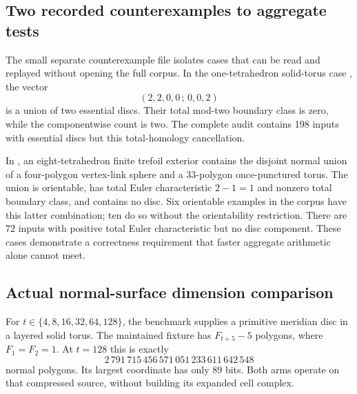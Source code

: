 \subsection{Two recorded counterexamples to aggregate tests}

The small separate counterexample file isolates cases that can be read and
replayed without opening the full corpus. In the one-tetrahedron solid-torus
case , the vector
\[
                    (2,2,0,0\,;\,0,0,2)
\]
is a union of two essential discs. Their total mod-two boundary class is
zero, while the componentwise count is two. The complete audit contains
198 inputs with essential discs but this total-homology cancellation.

In , an eight-tetrahedron finite trefoil
exterior contains the disjoint normal union of a four-polygon vertex-link
sphere and a 33-polygon once-punctured torus. The union is orientable, has
total Euler characteristic $2-1=1$ and nonzero total boundary class, and
contains no disc. Six orientable examples in the corpus have this latter
combination; ten do so without the orientability restriction. There are
72 inputs with positive total Euler characteristic but no disc component.
These cases demonstrate a correctness requirement that faster aggregate
arithmetic alone cannot meet.

\subsection{Actual normal-surface dimension comparison}

For $t\in\{4,8,16,32,64,128\}$, the benchmark supplies a primitive meridian
disc in a layered solid torus. The maintained fixture has
$F_{t+5}-5$ polygons, where $F_1=F_2=1$. At $t=128$ this is exactly
\[
        2\,791\,715\,456\,571\,051\,233\,611\,642\,548
\]
normal polygons. Its largest coordinate has only 89 bits. Both arms operate
on that compressed source, without building its expanded cell complex.

\begin{table}[htbp]
\centering\small
\setlength{\tabcolsep}{4pt}

\caption{Actual normal-vector disc queries. Total milliseconds include
source validation, certificate production and independent replay. The ratio
compares full-coordinate extraction with the three-weight query; A/A compares
two identical three-weight arms.}
\label{tab:dimension}
\end{table}

